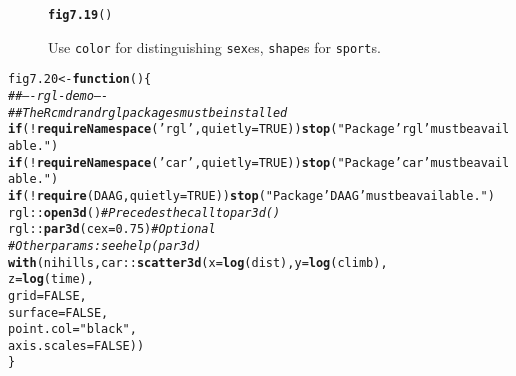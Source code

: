 \documentclass[12pt, a4paper,  BCOR=8.25mm, DIV=15]{scrartcl}\usepackage[]{graphicx}\usepackage[]{color}
\makeatletter
\newcommand{\hlnum}[1]{\textcolor[rgb]{0.686,0.059,0.569}{#1}}%
\newcommand{\hlstr}[1]{\textcolor[rgb]{0.192,0.494,0.8}{#1}}%
\newcommand{\hlcom}[1]{\textcolor[rgb]{0.678,0.584,0.686}{\textit{#1}}}%
\newcommand{\hlopt}[1]{\textcolor[rgb]{0,0,0}{#1}}%
\newcommand{\hlstd}[1]{\textcolor[rgb]{0.345,0.345,0.345}{#1}}%
\newcommand{\hlkwa}[1]{\textcolor[rgb]{0.161,0.373,0.58}{\textbf{#1}}}%
\newcommand{\hlkwb}[1]{\textcolor[rgb]{0.69,0.353,0.396}{#1}}%
\newcommand{\hlkwc}[1]{\textcolor[rgb]{0.333,0.667,0.333}{#1}}%
\newcommand{\hlkwd}[1]{\textcolor[rgb]{0.737,0.353,0.396}{\textbf{#1}}}%
\newenvironment{kframe}{%
 \def\at@end@of@kframe{}%
 \ifinner\ifhmode%
  \def\at@end@of@kframe{\end{minipage}}%
  \begin{minipage}{\columnwidth}%
 \fi\fi%
 \def\FrameCommand##1{\hskip\@totalleftmargin \hskip-\fboxsep
 \colorbox{shadecolor}{##1}\hskip-\fboxsep
     \hskip-\linewidth \hskip-\@totalleftmargin \hskip\columnwidth}%
 \MakeFramed {\advance\hsize-\width
   \@totalleftmargin\z@ \linewidth\hsize
   \@setminipage}}%
 {\par\unskip\endMakeFramed%
 \at@end@of@kframe}
\newenvironment{knitrout}{}{} %
\makeatother
\begin{document}
\begin{figure}[ht]
\begin{knitrout}
\color{fgcolor}\begin{kframe}
\begin{alltt}
\hlkwd{fig7.19}\hlstd{()}
\end{alltt}


{\ttfamily\noindent\bfseries{}}\end{kframe}
\end{knitrout}
\caption{Use \texttt{color} for distinguishing \texttt{sex}es,
\texttt{shape}s for \texttt{sport}s.}\label{fig:colshape}
\end{figure}




\begin{knitrout}
\color{fgcolor}\begin{kframe}
\begin{alltt}
\hlstd{fig7.20} \hlkwb{<-} \hlkwa{function}\hlstd{()\{}
\hlcom{## ---- rgl-demo ----}
\hlcom{## The Rcmdr and rgl packages must be installed}
\hlkwa{if}\hlstd{(}\hlopt{!}\hlkwd{requireNamespace}\hlstd{(}\hlstr{'rgl'}\hlstd{,} \hlkwc{quietly}\hlstd{=}\hlnum{TRUE}\hlstd{))}\hlkwd{stop}\hlstd{(}\hlstr{"Package 'rgl' must be available."}\hlstd{)}
\hlkwa{if}\hlstd{(}\hlopt{!}\hlkwd{requireNamespace}\hlstd{(}\hlstr{'car'}\hlstd{,} \hlkwc{quietly}\hlstd{=}\hlnum{TRUE}\hlstd{))}\hlkwd{stop}\hlstd{(}\hlstr{"Package 'car' must be available."}\hlstd{)}
\hlkwa{if}\hlstd{(}\hlopt{!}\hlkwd{require}\hlstd{(DAAG,} \hlkwc{quietly}\hlstd{=}\hlnum{TRUE}\hlstd{))}\hlkwd{stop}\hlstd{(}\hlstr{"Package 'DAAG' must be available."}\hlstd{)}
\hlstd{rgl}\hlopt{::}\hlkwd{open3d}\hlstd{()}            \hlcom{# Precedes the call to par3d()}
\hlstd{rgl}\hlopt{::}\hlkwd{par3d}\hlstd{(}\hlkwc{cex}\hlstd{=}\hlnum{0.75}\hlstd{)}     \hlcom{# Optional}
                         \hlcom{# Other params: see help(par3d)}
\hlkwd{with}\hlstd{(nihills, car}\hlopt{::}\hlkwd{scatter3d}\hlstd{(}\hlkwc{x}\hlstd{=}\hlkwd{log}\hlstd{(dist),} \hlkwc{y}\hlstd{=}\hlkwd{log}\hlstd{(climb),}
                        \hlkwc{z}\hlstd{=}\hlkwd{log}\hlstd{(time),}
                        \hlkwc{grid}\hlstd{=}\hlnum{FALSE}\hlstd{,}
                        \hlkwc{surface}\hlstd{=}\hlnum{FALSE}\hlstd{,}
                        \hlkwc{point.col}\hlstd{=}\hlstr{"black"}\hlstd{,}
                        \hlkwc{axis.scales}\hlstd{=}\hlnum{FALSE}\hlstd{))}
\hlstd{\}}
\end{alltt}
\end{kframe}
\end{knitrout}
\end{document}
